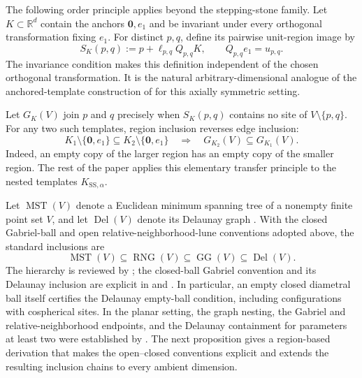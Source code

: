\documentclass[a4paper,fleqn]{cas-sc}
\theoremstyle{definition}
\theoremstyle{remark}
\newcommand{\R}{\mathds{R}}
\newcommand{\ellpq}{\ell_{p,q}}
\newcommand{\upq}{u_{p,q}}
\newcommand{\0}{\mathbf{0}}
\newcommand{\tv}[1]{#1}
\newcommand{\ttq}[1]{#1}
\newcommand{\tfg}[1]{#1}
\newcommand{\tv}[1]{\textcolor[HTML]{6A1B9A}{#1}}
\newcommand{\ttq}[1]{\textcolor[HTML]{008B8B}{#1}}
\newcommand{\tfg}[1]{\textcolor[HTML]{00FF00}{#1}}
\DeclareMathOperator{\RNG}{RNG}
\DeclareMathOperator{\GG}{GG}
\DeclareMathOperator{\Del}{Del}
\DeclareMathOperator{\MST}{MST}
\begin{document}
The following order principle applies beyond the stepping-stone
family. Let \(K\subset\R^d\) contain the anchors \(\0,e_1\) and be
invariant under every orthogonal transformation fixing \(e_1\). For
distinct \(p,q\), define its pairwise unit-region image by
\begin{equation}
S_K(p,q):=p+\ellpq Q_{p,q}K,
\qquad
Q_{p,q}e_1=\upq.
\end{equation}
The invariance condition makes this definition independent of the chosen
orthogonal transformation. It is the natural arbitrary-dimensional analogue
of the anchored-template construction of \citet{cardinal2009empty} for this
axially symmetric setting.

Let \(G_K(V)\) join \(p\) and \(q\) precisely when \(S_K(p,q)\)
contains no site of \(V\setminus\{p,q\}\). For any two such templates,
region inclusion reverses edge inclusion:
\begin{equation}\label{eq:unit-region-order-reversal}
K_1\setminus\{\0,e_1\}
\subseteq
K_2\setminus\{\0,e_1\}
\quad\Longrightarrow\quad
G_{K_2}(V)\subseteq G_{K_1}(V).
\end{equation}
Indeed, an empty copy of the larger region has an empty copy of the smaller
region. The rest of the paper applies this elementary transfer principle to
the nested templates \(K_{\mathrm{SS},\alpha}\).

\tv{Let $\MST(V)$ denote a Euclidean minimum spanning tree of a
\ttq{nonempty} finite point set $V$, and let $\Del(V)$ denote its Delaunay graph
\citep{mitchell2018}. With the closed Gabriel-ball and open
relative-neighborhood-lune conventions adopted above, the standard
inclusions are}
\begin{equation}
    \tv{
    \MST(V)\subseteq\RNG(V)\subseteq\GG(V)\subseteq\Del(V).
    }
\end{equation}
\tv{The hierarchy is reviewed by \citet{jaromczyk1992relative}; the
closed-ball Gabriel convention and its Delaunay inclusion are explicit in
\citet[Lemmas~1--2]{matula1980properties} and
\citet{cardinal2009empty}. In particular, an empty closed diametral ball
itself certifies the Delaunay empty-ball condition, including configurations
with cospherical sites.}
\tfg{In the planar setting, the graph nesting, the Gabriel and
relative-neighborhood endpoints, and the Delaunay containment for parameters
at least two were established by
\citet[Theorems~3.3--3.5 and~3.11]{kannangara2018stepping}. The next
proposition gives a region-based derivation that makes the open--closed
conventions explicit and extends the resulting inclusion chains to every
ambient dimension.}
\end{document}
